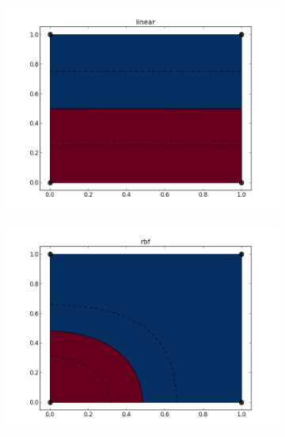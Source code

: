 \documentclass{article}
\begin{document}
\begin{figure}
	\centering
	\begin{subfigure}[b]{0.3\textwidth}	  
		\hspace*{-1.8in}
		\vspace*{0.15in}
		\includegraphics[width=2\textwidth]{eps/test_SVM_linear.png}
		\label{fig:figure1}
	\end{subfigure}
	\begin{subfigure}[b]{0.3\textwidth}
		\hspace*{-0.55in}
		\includegraphics[width=2\textwidth]{eps/test_SVM_rbf.png}
		\label{fig:figure2}
	\end{subfigure}
	\begin{subfigure}[b]{0.3\textwidth}

\end{subfigure}
\end{figure}
\end{document}
